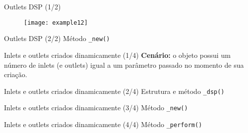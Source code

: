 \begin{frame}{Outlets DSP (1/2)}
\begin{figure}[h!]
\centering
\texttt{[image: example12]}
\end{figure}
\end{frame}


\begin{frame}{Outlets DSP (2/2)}
{Método \texttt{\_new()}}

\end{frame}


\begin{frame}{Inlets e outlets criados dinamicamente (1/4)}
\textbf{Cenário:} o objeto possui um número de inlets (e outlets) igual a um parâmetro
passado no momento de sua criação. 
\end{frame}


\begin{frame}{Inlets e outlets criados dinamicamente (2/4)}
{Estrutura e método \texttt{\_dsp()}}

\end{frame}


\begin{frame}{Inlets e outlets criados dinamicamente (3/4)}
{Método \texttt{\_new()}}

\end{frame}


\begin{frame}{Inlets e outlets criados dinamicamente (4/4)}
{Método \texttt{\_perform()}}

\end{frame}
